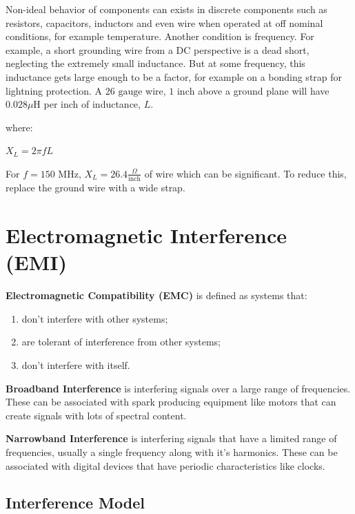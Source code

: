 \documentclass[
]{book}
\providecommand{\tightlist}{%
  \setlength{\itemsep}{0pt}\setlength{\parskip}{0pt}}
\begin{document}
Non-ideal behavior of components can exists in discrete components such as
resistors, capacitors, inductors and even wire when operated at off nominal
conditions, for example temperature. Another condition is frequency. For
example, a short grounding wire from a DC perspective is a dead short,
neglecting the extremely small inductance. But at some frequency, this
inductance gets large enough to be a factor, for example on a bonding strap for
lightning protection. A \(26 \text{ gauge}\) wire, \(1 \text{ inch}\) above a
ground plane will have \(0.028 \mu\text{H}\) per inch of inductance, \(L\).

where:

\(X_L = 2\pi f L\)

For \(f = 150 \text{ MHz}\), \(X_L = 26.4 \frac{\Omega}{\text{inch}}\) of wire
which can be significant. To reduce this, replace the ground wire with a wide
strap.

\hypertarget{electromagnetic-interference-emi}{%
\section{Electromagnetic Interference (EMI)}\label{electromagnetic-interference-emi}}

\textbf{Electromagnetic Compatibility (EMC)} is defined as systems that:

\begin{enumerate}
\def\labelenumi{\arabic{enumi}.}
\tightlist
\item
  don't interfere with other systems;
\item
  are tolerant of interference from other systems;
\item
  don't interfere with itself.
\end{enumerate}

\textbf{Broadband Interference} is interfering signals over a large range of
frequencies. These can be associated with spark producing equipment like motors
that can create signals with lots of spectral content.

\textbf{Narrowband Interference} is interfering signals that have a limited range of
frequencies, usually a single frequency along with it's harmonics. These can be
associated with digital devices that have periodic characteristics like clocks.

\hypertarget{interference-model}{%
\subsection{Interference Model}\label{interference-model}}
\end{document}
